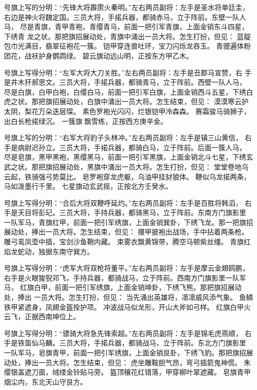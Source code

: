 号旗上写的分明：“先锋大将霹雳火秦明。”左右两员副将：左手是圣水将单廷圭，
右边是神火将魏定国。三员大将，手掿兵器，都骑赤马，立于阵前。东壁一队人马，
尽是青旗，青甲青袍，青缨青马，前面一把引军青旗，上面金销东斗四星，下绣青
龙之状。那把旗招展动处，青旗中涌出一员大将。怎生打扮，但见：
蓝靛包巾光满目，翡翠征袍花一簇。
铠甲穿连兽吐环，宝刀闪烁龙吞玉。
青骢遍体粉团花，战袄护身鹦鹉绿。
碧云旗动远山明，正按东方甲乙木。

号旗上写得分明：“左军大将大刀关胜。”左右两员副将：左手是丑郡马宣赞，右
手是井木犴郝思文。三员大将，手掿兵器，都骑青马，立于阵前。西壁一队人马，
尽是白旗，白甲白袍，白缨白马，前面一把引军白旗，上面金销西斗五星，下绣白
虎之状。那把旗招展动处，白旗中涌出一员大将。怎生结束，但见：
漠漠寒云护太阴，梨花万朵迭层琛。
素色罗袍光闪闪，烂银铠甲冷森森。
赛霜骏马骑狮子，出白长枪掿绿沉。
一簇旗飘雪练，正按西方庚辛金。

号旗上写的分明：“右军大将豹子头林冲。”左右两员副将：左手是镇三山黄信，
右手是病尉迟孙立。三员大将，手掿兵器，都骑白马，立于阵前。后面一簇人马，
尽是皂旗，黑甲黑袍，黑缨黑马，前面一把引军黑旗，上面金销北斗七星，下绣玄
武之状。那把旗招展动处，黑旗中涌出一员大将。怎生打扮，但见：
堂堂卷地乌云起，铁骑强弓势莫比。
皂罗袍穿龙虎躯，乌油甲挂豺狼体。
鞭似乌龙掿两条，马如泼墨行千里。
七星旗动玄武摇，正按北方壬癸水。

号旗上写得分明：“合后大将双鞭呼延灼。”左右两员副将：左手是百胜将韩滔，
右手是天目将彭玘。三员大将，手持兵器，都骑黑马，立于阵前。东南方门旗影里
一队军马，青旗红甲，前面一把引军绣旗，上面金销巽卦，下绣飞龙。那一把旗招
展动处，捧出一员大将。怎生结束，但见：
擐甲披袍出战场，手中拈着两条枪。
雕弓鸾凤壶中插，宝剑沙鱼鞘内藏。
束雾衣飘黄锦带，腾空马顿紫丝缰。
青旗红焰龙蛇动，独据东南守巽方。

号旗上写得分明：“虎军大将双枪将董平。”左右两员副将：左手是摩云金翅鸥鹏，
右手是火眼狻猊邓飞，手持兵器，都骑战马，立于阵前。西南方门旗影里一队军马，
红旗白甲，前面一把引军绣旗，上面金销坤卦，下绣飞熊。那把旗招展动处，捧出
一员大将。怎生打扮，但见：
当先涌出英雄将，凛凛威风添气象。
鱼鳞铁甲紧遮身，凤翅金盔拴护项。
冲波战马似龙形，开山大斧如弓样。
红旗白甲火云飞，正据西南坤位上。

号旗上写得分明：“骠骑大将急先锋索超。”左右两员副将：左手是锦毛虎燕顺，
右手是铁笛仙马麟。三员大将，手掿兵器，都骑战马，立于阵前。东北方门旗影里
一队军马，皂旗青甲，前面一把引军绣旗，上面金销艮卦，下绣飞豹。那把旗招展
动处，捧出一员大将。怎生结束，但见：
虎坐雕鞍胆气昂，弯弓插箭鬼神慌。
朱缨银盖遮刀面，绒缕金铃贴马旁。
盔顶穰花红错落，甲穿柳叶翠遮藏。
皂旗青甲烟尘内，东北天山守艮方。

